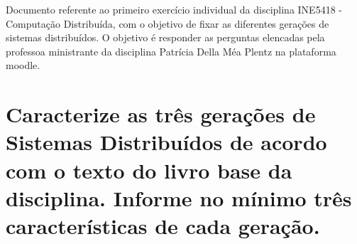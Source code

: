 \documentclass[
    article,            %
    11pt,               %
    oneside,            %
    a4paper,            %
    english,            %
    brazil,             %
    sumario=tradicional,
    ]{abntex2}
\begin{document}

\frenchspacing 


%
%

\maketitle


\begin{resumoumacoluna}
    Documento referente ao primeiro exercício individual da disciplina INE5418 - Computação Distribuída, com o objetivo de fixar as diferentes gerações de sistemas distribuídos. O objetivo é responder as perguntas elencadas pela professoa ministrante da disciplina Patrícia Della Méa Plentz na plataforma moodle.
 
 \vspace{\onelineskip}
 
\end{resumoumacoluna}


\textual



\section{Caracterize as três gerações de Sistemas Distribuídos de acordo com o texto do livro base da disciplina. Informe no mínimo três características de cada geração.}
\end{document}
